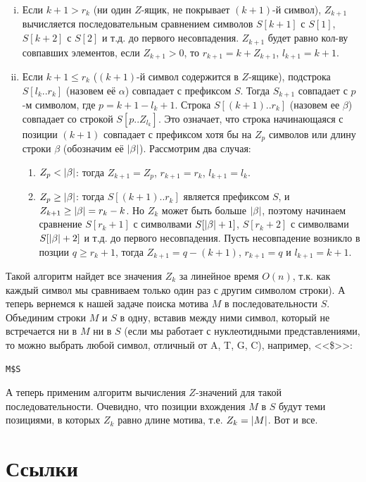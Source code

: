 \documentclass[letterpaper, 11pt]{article}
\DeclarePairedDelimiter{\abs}{\lvert}{\rvert}
\begin{document}
\begin{enumerate}[(i)]
\item
Если $k + 1 > r_k$ (ни один $Z$-ящик, не покрывает $(k+1)$-й символ), $Z_{k+1}$ вычисляется последовательным сравнением символов $S[k+1]$ с $S[1]$, $S[k+2]$ с $S[2]$ и т.д. до первого несовпадения. $Z_{k+1}$ будет равно кол-ву совпавших элементов, если $Z_{k+1} > 0$, то $r_{k+1} = k + Z_{k+1}$, $l_{k+1} = k + 1$.
\item
Если $k + 1 \leq r_k$ ($(k+1)$-й символ содержится в $Z$-ящике), подстрока $S[l_k..r_k]$ (назовем её $\alpha$) совпадает с префиксом $S$. Тогда $S_{k+1}$ совпадает с $p$-м символом, где $p = k + 1 - l_k + 1$. Строка $S[(k+1)..r_k]$ (назовем ее $\beta$) совпадает со строкой $S[p..Z_{l_k}]$. Это означает, что строка начинающаяся с позиции $(k+1)$ совпадает с префиксом хотя бы на $Z_{p}$ символов или длину строки $\beta$ (обозначим её $\abs{\beta}$). Рассмотрим два случая:
\begin{enumerate}
 \item
 $Z_{p} < \abs{\beta}$: тогда $Z_{k+1} = Z_{p}$, $r_{k+1} = r_{k}$, $l_{k+1} = l_k$.
 \item
 $Z_{p} \geq \abs{\beta}$: тогда $S[(k+1)..r_k]$ является префиксом $S$, и $Z_{k+1} \geq \abs{\beta} = r_k - k$. Но $Z_k$ может быть больше $\abs{\beta}$, поэтому начинаем сравнение $S[r_k + 1]$ с символвами $S[\abs{\beta} + 1]$, $S[r_k + 2]$ с символвами $S[\abs{\beta} + 2]$ и т.д. до первого несовпадения. Пусть несовпадение возникло в позции $q \geq r_k + 1$, тогда $Z_{k+1} = q - (k +1)$, $r_{k+1} = q$ и $l_{k+1} = k + 1$.
\end{enumerate}
\end{enumerate}
\par
Такой алгоритм найдет все значения $Z_k$ за линейное время $O(n)$, т.к. как каждый символ мы сравниваем только один раз с другим символом строки). А теперь вернемся к нашей задаче поиска мотива $M$ в последовательности $S$. Объединим строки $M$ и $S$ в одну, вставив между ними символ, который не встречается ни в $M$ ни в $S$ (если мы работает с нуклеотидными представлениями, то можно выбрать любой символ, отличный от A, T, G, C), например, <<\$>>:
\begin{verbatim}
M$S
\end{verbatim}
\par
А теперь применим алгоритм вычисления $Z$-значений для такой последовательности. Очевидно, что позиции вхождения $M$ в $S$ будут теми позициями, в которых $Z_k$ равно длине мотива, т.е. $Z_k = \abs{M}$. Вот и все.
\section{Ссылки}
\end{document}
